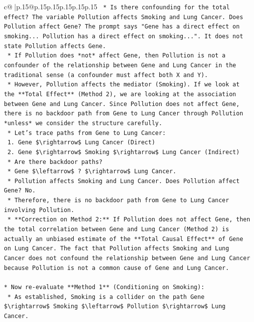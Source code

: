 \documentclass{article}
\begin{document}
{\begin{supertabular}{c@{$\;$}|p{.15\linewidth}@{}p{.15\linewidth}p{.15\linewidth}p{.15\linewidth}p{.15\linewidth}p{.15\linewidth}}
{{{\texttt{    *   Is there confounding for the total effect? The variable Pollution affects Smoking and Lung Cancer. Does Pollution affect Gene? The prompt says "Gene has a direct effect on smoking... Pollution has a direct effect on smoking...". It does not state Pollution affects Gene.} \\
\texttt{    *   If Pollution does *not* affect Gene, then Pollution is not a confounder of the relationship between Gene and Lung Cancer in the traditional sense (a confounder must affect both X and Y).} \\
\texttt{    *   However, Pollution affects the mediator (Smoking). If we look at the **Total Effect** (Method 2), we are looking at the association between Gene and Lung Cancer. Since Pollution does not affect Gene, there is no backdoor path from Gene to Lung Cancer through Pollution *unless* we consider the structure carefully.} \\
\texttt{    *   Let's trace paths from Gene to Lung Cancer:} \\
\texttt{        1.  Gene \$\textbackslash{}rightarrow\$ Lung Cancer (Direct)} \\
\texttt{        2.  Gene \$\textbackslash{}rightarrow\$ Smoking \$\textbackslash{}rightarrow\$ Lung Cancer (Indirect)} \\
\texttt{    *   Are there backdoor paths?} \\
\texttt{        *   Gene \$\textbackslash{}leftarrow\$ ? \$\textbackslash{}rightarrow\$ Lung Cancer.} \\
\texttt{        *   Pollution affects Smoking and Lung Cancer. Does Pollution affect Gene? No.} \\
\texttt{        *   Therefore, there is no backdoor path from Gene to Lung Cancer involving Pollution.} \\
\texttt{    *   **Correction on Method 2:** If Pollution does not affect Gene, then the total correlation between Gene and Lung Cancer (Method 2) is actually an unbiased estimate of the **Total Causal Effect** of Gene on Lung Cancer. The fact that Pollution affects Smoking and Lung Cancer does not confound the relationship between Gene and Lung Cancer because Pollution is not a common cause of Gene and Lung Cancer.} \\
\\ 
\texttt{*   Now re{-}evaluate **Method 1** (Conditioning on Smoking):} \\
\texttt{    *   As established, Smoking is a collider on the path Gene \$\textbackslash{}rightarrow\$ Smoking \$\textbackslash{}leftarrow\$ Pollution \$\textbackslash{}rightarrow\$ Lung Cancer.} \\
}}}
\end{supertabular}}
\end{document}
